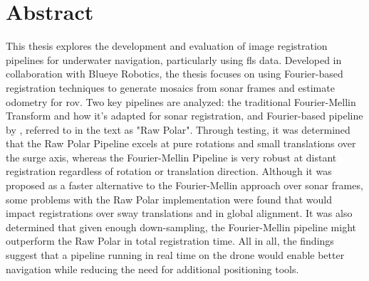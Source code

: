 \chapter*{Abstract}
\label{chap:abstract}

This thesis explores the development and evaluation of image registration pipelines for underwater navigation, particularly using \acrfull{fls} data. Developed in collaboration with Blueye Robotics, the thesis focuses on using Fourier-based registration techniques to generate mosaics from sonar frames and estimate odometry for \acrfull{rov}. Two key pipelines are analyzed: the traditional Fourier-Mellin Transform and how it's adapted for sonar registration, and Fourier-based pipeline by \citeauthor{Hurtos2015}, referred to in the text as "Raw Polar". Through testing, it was determined that the Raw Polar Pipeline excels at pure rotations and small translations over the surge axis, whereas the Fourier-Mellin Pipeline is very robust at distant registration regardless of rotation or translation direction. Although it was proposed as a faster alternative to the Fourier-Mellin approach over sonar frames, some problems with the Raw Polar implementation were found that would impact registrations over sway translations and in global alignment. It was also determined that given enough down-sampling, the Fourier-Mellin pipeline might outperform the Raw Polar in total registration time. All in all, the findings suggest that a pipeline running in real time on the drone would enable better navigation while reducing the need for additional positioning tools. 